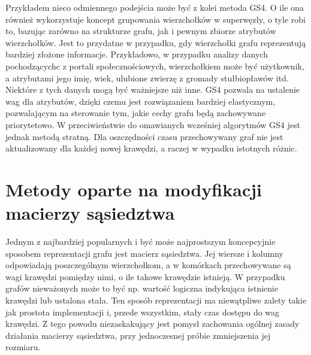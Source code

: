     Przykładem nieco odmiennego podejścia może być z kolei metoda GS4\cite{Ashrafi-Payaman_Kangavari_Hosseini_Fander_2020}. O ile ona również wykorzystuje koncept grupowania wierzchołków w superwęzły, o tyle robi to, bazując zarówno na strukturze grafu, jak i pewnym zbiorze atrybutów wierzchołków. Jest to przydatne w przypadku, gdy wierzchołki grafu reprezentują bardziej złożone informacje. Przykładowo, w przypadku analizy danych pochodzącychc z portali społecznościowych, wierzchołkiem może być użytkownik, a atrybutami jego imię, wiek, ulubione zwierzę z gromady stułbiopławów itd. Niektóre z tych danych mogą być ważniejsze niż inne. GS4 pozwala na ustalenie wag dla atrybutów, dzięki czemu jest rozwiązaniem bardziej elastycznym, pozwalającym na sterowanie tym, jakie cechy grafu będą zachowywane priorytetowo. W przeciwieństwie do omawianych wcześniej algorytmów GS4 jest jednak metodą stratną. Dla oszczędności czasu przechowywany graf nie jest aktualizowany dla każdej nowej krawędzi, a raczej w wypadku istotnych różnic.  

\section{Metody oparte na modyfikacji macierzy sąsiedztwa}
    Jednym z najbardziej popularnych i być może najprostszym koncepcyjnie sposobem reprezentacji grafu jest macierz sąsiedztwa. Jej wiersze i kolumny odpowiadają poszczególnym wierzchołkom, a w komórkach przechowywane są wagi krawędzi pomiędzy nimi, o ile takowe krawędzie istnieją. W przypadku grafów nieważonych może to być np. wartość logiczna indykująca istnienie krawędzi lub ustalona stała. Ten sposób reprezentacji ma niewątpliwe zalety takie jak prostota implementacji i, przede wszystkim, stały czas dostępu do wag krawędzi. Z tego powodu niezaskakujący jest pomysł zachowania ogólnej zasady działania macierzy sąsiedztwa, przy jednoczesnej próbie zmniejszenia jej rozmiaru.     


